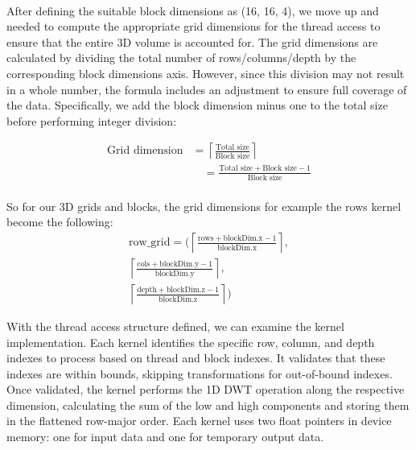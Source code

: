 \documentclass[journal,11pt]{IEEEtran}
\begin{document}
\vspace{-0.2em}\\
After defining the suitable block dimensions as (16, 16, 4), we move up and needed to compute the appropriate grid dimensions for the thread access to ensure that the entire 3D volume is accounted for. The grid dimensions are calculated by dividing the total number of rows/columns/depth by the corresponding block dimensions axis. However, since this division may not result in a whole number, the formula includes an adjustment to ensure full coverage of the data. Specifically, we add the block dimension minus one to the total size before performing integer division:

\begin{equation}
    \begin{aligned}
        \text{Grid dimension} &= \left\lceil \frac{\text{Total size}}{\text{Block size}} \right\rceil \\
        &\quad = \frac{\text{Total size} + \text{Block size} - 1}{\text{Block size}}
    \end{aligned}
\end{equation}
\\

So for our 3D grids and blocks, the grid dimensions for example the rows kernel become the following:
\begin{equation}
    \begin{aligned}
        \text{row\_grid} = \Bigg( 
        \left\lceil \frac{\text{rows} + \text{blockDim.x} - 1}{\text{blockDim.x}} \right\rceil, \\
        \left\lceil \frac{\text{cols} + \text{blockDim.y} - 1}{\text{blockDim.y}} \right\rceil, \\
        \left\lceil \frac{\text{depth} + \text{blockDim.z} - 1}{\text{blockDim.z}} \right\rceil
        \Bigg)
    \end{aligned}
\end{equation}
 
With the thread access structure defined, we can examine the kernel implementation. Each kernel identifies the specific row, column, and depth indexes to process based on thread and block indexes. It validates that these indexes are within bounds, skipping transformations for out-of-bound indexes. Once validated, the kernel performs the 1D DWT operation along the respective dimension, calculating the sum of the low and high components and storing them in the flattened row-major order. Each kernel uses two float pointers in device memory: one for input data and one for temporary output data.\\
\end{document}
